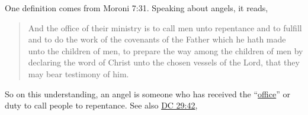 		One definition comes from Moroni 7:31. Speaking about angels, it reads,
		
		\begin{quote}
			And the office of their ministry is to call men unto repentance
			and to fulfill and to do the work of the covenants of the Father
			which he hath made unto the children of men,
			to prepare the way among the children of men
			by declaring the word of Christ unto the chosen vessels of the Lord,
			that they may bear testimony of him.
		\end{quote}
		
		So on this understanding, an angel is someone who has received the ``\hyperref[OFFICE-1828]{office}'' or duty to call people to repentance. See also \hyperref[DC29-42]{DC 29:42},